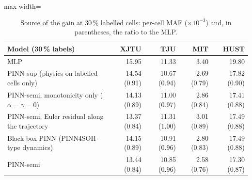 \begin{table}[t]\centering\small
\caption{Source of the gain at 30\,\% labelled cells: per-cell MAE ($\times10^{-3}$) and, in parentheses, the ratio to the MLP.}\label{tab:ablation}
\begin{adjustbox}{max width=\textwidth}\begin{tabular}{lrrrr}\toprule
Model (30\,\% labels) & XJTU & TJU & MIT & HUST \\\midrule
MLP & 15.95 & 11.33 & 3.40 & 19.80 \\
PINN-sup (physics on labelled cells only) & 14.54 (0.91) & 10.67 (0.94) & 2.69 (0.79) & 17.82 (0.90) \\
PINN-semi, monotonicity only ($\alpha = \gamma = 0$) & 14.13 (0.89) & 11.00 (0.97) & 2.86 (0.84) & 17.41 (0.88) \\
PINN-semi, Euler residual along the trajectory & 13.37 (0.84) & 11.31 (1.00) & 3.01 (0.89) & 17.49 (0.88) \\
Black-box PINN (PINN4SOH-type dynamics) & 14.15 (0.89) & 10.91 (0.96) & 2.80 (0.83) & 17.49 (0.88) \\
PINN-semi & 13.44 (0.84) & 10.85 (0.96) & 2.58 (0.76) & 17.30 (0.87) \\
\bottomrule\end{tabular}\end{adjustbox}\end{table}
